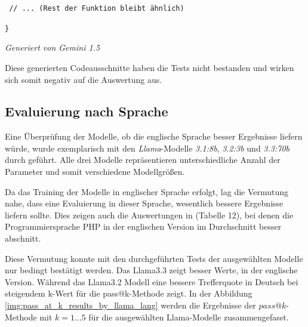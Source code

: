 \texttt{\hspace{0.6cm} // ... (Rest der Funktion bleibt ähnlich)}

\texttt{\}}

\begin{flushright}
	\textit{Generiert von Gemini 1.5}
\end{flushright}

\hrulefill

Diese generierten Codeausschnitte haben die Tests nicht bestanden und wirken sich somit negativ auf die Auswertung aus.\vspace{0.2cm}


\subsection{Evaluierung nach Sprache}
Eine Überprüfung der Modelle, ob die englische Sprache besser Ergebnisse liefern würde, wurde exemplarisch mit den \textit{Llama}-Modelle \textit{3.1:8b}, \textit{3.2:3b} und \textit{3.3:70b} durch geführt. Alle drei Modelle repräsentieren unterschiedliche Anzahl der Parameter und somit verschiedene Modellgrößen.\vspace{0.2cm}

Da das Training der Modelle in englischer Sprache erfolgt, lag die Vermutung nahe, dass eine Evaluierung in dieser Sprache, wesentlich bessere Ergebnisse liefern sollte. Dies zeigen auch die Auswertungen in \cite[][11]{peng-2024} (Tabelle 12), bei denen die Programmiersprache PHP in der englischen Version im Durchschnitt besser abschnitt.\vspace{0.2cm}

Diese Vermutung konnte mit den durchgeführten Tests der ausgewählten Modelle nur bedingt bestätigt werden. Das Llama3.3 zeigt besser Werte, in der englische Version. Während das Llama3.2 Modell eine bessere Trefferquote in Deutsch bei steigendem k-Wert für die pass@k-Methode zeigt. In der Abbildung \ref{img:pass_at_k_results_by_llama_lang} werden die Ergebnisse der $pass@k$-Methode mit $k=1 … 5$ für die ausgewählten Llama-Modelle zusammengefasst.\vspace{0.2cm}

